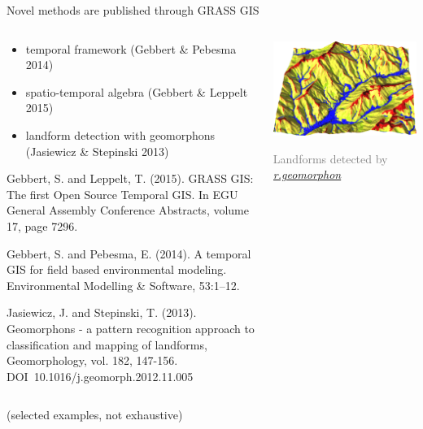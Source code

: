 \documentclass[xcolor={dvipsnames,usenames},beamer,aspectratio=169]{beamer}
\newcommand{\gmodule}[1]{\href{http://grass.osgeo.org/grass74/manuals/#1.html}{\emph{#1}}}
\begin{document}
\begin{frame}{Novel methods are published through GRASS GIS}

\begin{columns}
\begin{column}{0.5\textwidth}

\begin{itemize}
  \item temporal framework (Gebbert \& Pebesma 2014)
  \item spatio-temporal algebra (Gebbert \& Leppelt 2015)
  \item landform detection with geomorphons (Jasiewicz \& Stepinski 2013)
\end{itemize}

\bigskip
\footnoterule
\tiny

Gebbert, S. and Leppelt, T. (2015). GRASS GIS: The first Open Source Temporal GIS. In EGU General Assembly Conference Abstracts, volume 17, page 7296.

Gebbert, S. and Pebesma, E. (2014). A temporal GIS for field based environmental modeling. Environmental Modelling \& Software, 53:1–12.

Jasiewicz, J. and Stepinski, T. (2013). Geomorphons - a pattern recognition approach to classification and mapping of landforms, Geomorphology, vol. 182, 147-156. DOI~10.1016/j.geomorph.2012.11.005

\end{column}
\begin{column}{0.5\textwidth}
\centering
\includegraphics[width=\textwidth]{geomorphon_3d}

\textcolor{gray}{
\footnotesize
Landforms detected by \gmodule{r.geomorphon}
}

\end{column}
\end{columns}

\bigskip

\centering

\footnotesize

(selected examples, not exhaustive)

\end{frame}
\end{document}
